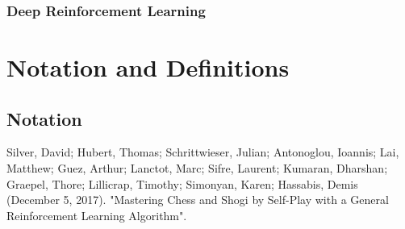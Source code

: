 \documentclass[titlepage]{article}
\begin{document}
\subsubsection{Deep Reinforcement Learning}

\newpage

\section{Notation and Definitions}
\subsection{Notation}

\newpage

\begin{thebibliography}{100}
Silver, David; Hubert, Thomas; Schrittwieser, Julian; Antonoglou, Ioannis; Lai, Matthew; Guez, Arthur; Lanctot, Marc; Sifre, Laurent; Kumaran, Dharshan; Graepel, Thore; Lillicrap, Timothy; Simonyan, Karen; Hassabis, Demis (December 5, 2017). "Mastering Chess and Shogi by Self-Play with a General Reinforcement Learning Algorithm".

\end{thebibliography}
\end{document}
